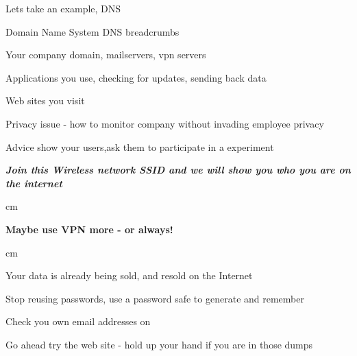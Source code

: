 \documentclass[Screen16to9,17pt,footrule]{foils}
\begin{document}

\begin{list1}
\item Lets take an example, DNS
\item Domain Name System DNS breadcrumbs
\begin{list2}
\item Your company domain, mailservers, vpn servers
\item Applications you use, checking for updates, sending back data
\item Web sites you visit
\item Privacy issue - how to monitor company without invading employee privacy
\end{list2}
\vskip 1cm
\item Advice show your users,ask them to participate in a experiment
\end{list1}

\emph{\bf Join this Wireless network SSID and we will show you who you are on the internet}

 cm
\centerline{\bf\Large Maybe use VPN more - or always!}
 cm



\begin{list1}
\item Your data is already being sold, and resold on the Internet
\item Stop reusing passwords, use a password safe to generate and remember
\item Check you own email addresses on 
\end{list1}

\centerline{Go ahead try the web site - hold up your hand if you are in those dumps}



{~}
\end{document}
